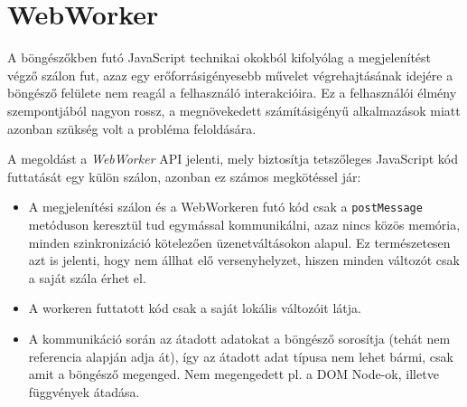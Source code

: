 \section{WebWorker}

A böngészőkben futó JavaScript technikai okokból kifolyólag a megjelenítést
végző szálon fut, azaz egy erőforrásigényesebb művelet végrehajtásának idejére a
böngésző felülete nem reagál a felhasználó interakcióira. Ez a felhasználói
élmény szempontjából nagyon rossz, a megnövekedett számításigényű alkalmazások
miatt azonban szükség volt a probléma feloldására.

A megoldást a \emph{WebWorker} API jelenti, mely biztosítja tetszőleges
JavaScript kód futtatását egy külön szálon\cite{webworker}, azonban ez számos
megkötéssel jár:

\begin{itemize}
  \item A megjelenítési szálon és a WebWorkeren futó kód csak a
    \texttt{postMessage} metóduson keresztül tud egymással kommunikálni, azaz
    nincs közös memória, minden szinkronizáció kötelezően üzenetváltásokon
    alapul. Ez természetesen azt is jelenti, hogy nem állhat elő versenyhelyzet,
    hiszen minden változót csak a saját szála érhet el.
  \item A workeren futtatott kód csak a saját lokális változóit látja.
  \item A kommunikáció során az átadott adatokat a böngésző sorosítja (tehát nem
    referencia alapján adja át), így az átadott adat típusa nem lehet bármi,
    csak amit a böngésző megenged. Nem megengedett pl. a DOM Node-ok, illetve
    függvények átadása.
\end{itemize}
